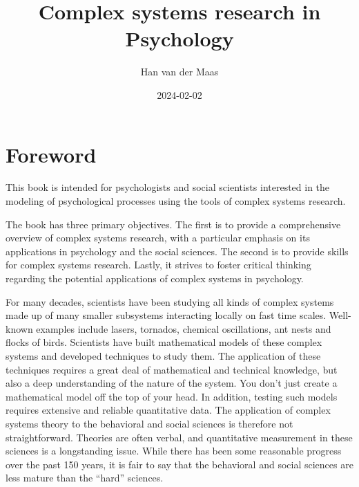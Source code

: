 \documentclass[
  a4paper,
  DIV=11,
  numbers=noendperiod,
  oneside]{scrreprt}
\title{Complex systems research in Psychology}
\author{Han van der Maas}
\date{2024-02-02}
\renewcommand*\contentsname{Table of contents}
\newcommand\contentsname{Table of contents}
\begin{document}
\maketitle
\ifdefined\Shaded\renewenvironment{Shaded}{\begin{tcolorbox}[borderline west={3pt}{0pt}{shadecolor}, breakable, sharp corners, frame hidden, boxrule=0pt, interior hidden, enhanced]}{\end{tcolorbox}}\fi

\renewcommand*\contentsname{Table of contents}
{
\hypersetup{linkcolor=}
\setcounter{tocdepth}{7}
\tableofcontents
}

\hypertarget{foreword}{%
\chapter*{Foreword}\label{foreword}}


This book is intended for psychologists and social scientists interested
in the modeling of psychological processes using the tools of complex
systems research.

The book has three primary objectives. The first is to provide a
comprehensive overview of complex systems research, with a particular
emphasis on its applications in psychology and the social sciences. The
second is to provide skills for complex systems research. Lastly, it
strives to foster critical thinking regarding the potential applications
of complex systems in psychology.

{}

For many decades, scientists have been studying all kinds of complex
systems made up of many smaller subsystems interacting locally on fast
time scales. Well-known examples include lasers, tornados, chemical
oscillations, ant nests and flocks of birds. Scientists have built
mathematical models of these complex systems and developed techniques to
study them. The application of these techniques requires a great deal of
mathematical and technical knowledge, but also a deep understanding of
the nature of the system. You don't just create a mathematical model off
the top of your head. In addition, testing such models requires
extensive and reliable quantitative data. The application of complex
systems theory to the behavioral and social sciences is therefore not
straightforward. Theories are often verbal, and quantitative measurement
in these sciences is a longstanding issue. While there has been some
reasonable progress over the past 150 years, it is fair to say that the
behavioral and social sciences are less mature than the ``hard''
sciences.
\end{document}
